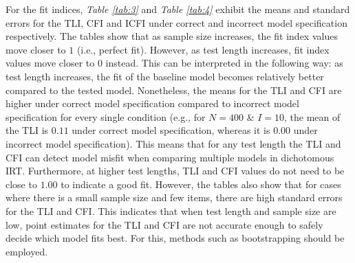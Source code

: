 \documentclass[Royal,sageapa,times,doublespace]{sagej}
\begin{document}
\indent For the fit indices, \textit{Table \ref{tab:3}} and \textit{Table \ref{tab:4}} exhibit the means and standard errors for the TLI, CFI and ICFI under correct and incorrect model specification respectively. The tables show that as sample size increases, the fit index values move closer to $1$ (i.e., perfect fit). However, as test length increases, fit index values move closer to $0$ instead. This can be interpreted in the following way: as test length increases, the fit of the baseline model becomes relatively better compared to the tested model. Nonetheless, the means for the TLI and CFI are higher under correct model specification compared to incorrect model specification for every single condition (e.g., for $N = 400$ \& $I = 10$, the mean of the TLI is $0.11$ under correct model specification, whereas it is $0.00$ under incorrect model specification). This means that for any test length the TLI and CFI can detect model misfit when comparing multiple models in dichotomous IRT. Furthermore, at higher test lengths, TLI and CFI values do not need to be close to $1.00$ to indicate a good fit. However, the tables also show that for cases where there is a small sample size and few items, there are high standard errors for the TLI and CFI. This indicates that when test length and sample size are low, point estimates for the TLI and CFI are not accurate enough to safely decide which model fits best. For this, methods such as bootstrapping should be employed. \\
\end{document}
